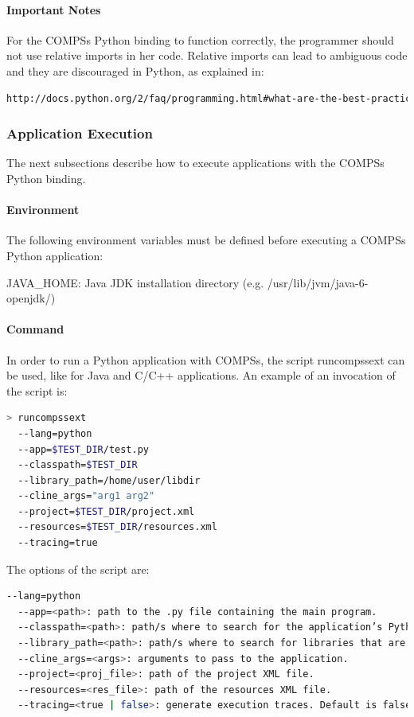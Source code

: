 \paragraph{Important Notes}
For the COMPSs Python binding to function correctly, the programmer should not use relative imports 
in her code. Relative imports can lead to ambiguous code and they are discouraged in Python, as explained in:

\begin{lstlisting}[language=html]
http://docs.python.org/2/faq/programming.html#what-are-the-best-practices-for-using-import-in-a-module
\end{lstlisting}

\subsubsection{Application Execution}
The next subsections describe how to execute applications with the COMPSs Python binding.

\paragraph{Environment}
The following environment variables must be defined before executing a COMPSs Python application:

JAVA\_HOME: Java JDK installation directory (e.g. /usr/lib/jvm/java-6-openjdk/)

\paragraph{Command}

In order to run a Python application with COMPSs, the script runcompssext can be used, like for 
Java and C/C++ applications. An example of an invocation of the script is:

\begin{lstlisting}[language=bash]
> runcompssext
  --lang=python
  --app=$TEST_DIR/test.py
  --classpath=$TEST_DIR
  --library_path=/home/user/libdir
  --cline_args="arg1 arg2"
  --project=$TEST_DIR/project.xml
  --resources=$TEST_DIR/resources.xml
  --tracing=true
\end{lstlisting}

The options of the script are:

\begin{lstlisting}[language=bash]
  --lang=python
  --app=<path>: path to the .py file containing the main program.
  --classpath=<path>: path/s where to search for the application’s Python modules. The default value is the current directory.
  --library_path=<path>: path/s where to search for libraries that are not in a standard path. The default value is the variable $LD_LIBRARY_PATH.
  --cline_args=<args>: arguments to pass to the application.
  --project=<proj_file>: path of the project XML file.
  --resources=<res_file>: path of the resources XML file.
  --tracing=<true | false>: generate execution traces. Default is false.
\end{lstlisting}